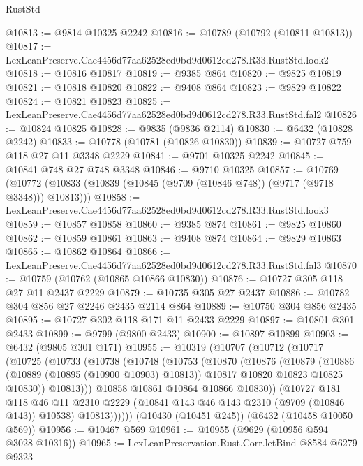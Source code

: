 \begin{lexlean}{RustStd}
\begin{coremodule}
@10813 := @9814 @10325 @2242
@10816 := @10789 (@10792 (@10811 @10813))
@10817 := LexLeanPreserve.Cae4456d77aa62528ed0bd9d0612cd278.R33.RustStd.look2
@10818 := @10816 @10817
@10819 := @9385 @864
@10820 := @9825 @10819
@10821 := @10818 @10820
@10822 := @9408 @864
@10823 := @9829 @10822
@10824 := @10821 @10823
@10825 := LexLeanPreserve.Cae4456d77aa62528ed0bd9d0612cd278.R33.RustStd.fal2
@10826 := @10824 @10825
@10828 := @9835 (@9836 @2114)
@10830 := @6432 (@10828 @2242)
@10833 := @10778 (@10781 (@10826 @10830))
@10839 := @10727 @759 @118 @27 @11 @3348 @2229
@10841 := @9701 @10325 @2242
@10845 := @10841 @748 @27 @748 @3348
@10846 := @9710 @10325
@10857 := @10769
    (@10772 (@10833 (@10839 (@10845 (@9709 (@10846 @748)) (@9717 (@9718 @3348))) @10813)))
@10858 := LexLeanPreserve.Cae4456d77aa62528ed0bd9d0612cd278.R33.RustStd.look3
@10859 := @10857 @10858
@10860 := @9385 @874
@10861 := @9825 @10860
@10862 := @10859 @10861
@10863 := @9408 @874
@10864 := @9829 @10863
@10865 := @10862 @10864
@10866 := LexLeanPreserve.Cae4456d77aa62528ed0bd9d0612cd278.R33.RustStd.fal3
@10870 := @10759 (@10762 (@10865 @10866 @10830))
@10876 := @10727 @305 @118 @27 @11 @2437 @2229
@10879 := @10735 @305 @27 @2437
@10886 := @10782 @304 @856 @27 @2246 @2435 @2114 @864
@10889 := @10750 @304 @856 @2435
@10895 := @10727 @302 @118 @171 @11 @2433 @2229
@10897 := @10801 @301 @2433
@10899 := @9799 (@9800 @2433)
@10900 := @10897 @10899
@10903 := @6432 (@9805 @301 @171)
@10955 := @10319
    (@10707
      (@10712
        (@10717
          (@10725
            (@10733
              (@10738
                (@10748
                  (@10753
                    (@10870
                      (@10876
                        (@10879
                          (@10886
                            (@10889 (@10895 (@10900 @10903) @10813))
                            @10817
                            @10820
                            @10823
                            @10825
                            @10830))
                        @10813)))
                  @10858
                  @10861
                  @10864
                  @10866
                  @10830))
              (@10727
                @181
                @118
                @46
                @11
                @2310
                @2229
                (@10841 @143 @46 @143 @2310 (@9709 (@10846 @143)) @10538)
                @10813))))))
    (@10430 (@10451 @245))
    (@6432 (@10458 @10050 @569))
@10956 := @10467 @569
@10961 := @10955 (@9629 (@10956 @594 @3028 @10316))
@10965 := LexLeanPreservation.Rust.Corr.letBind @8584 @6279 @9323

\end{coremodule}
\end{lexlean}
